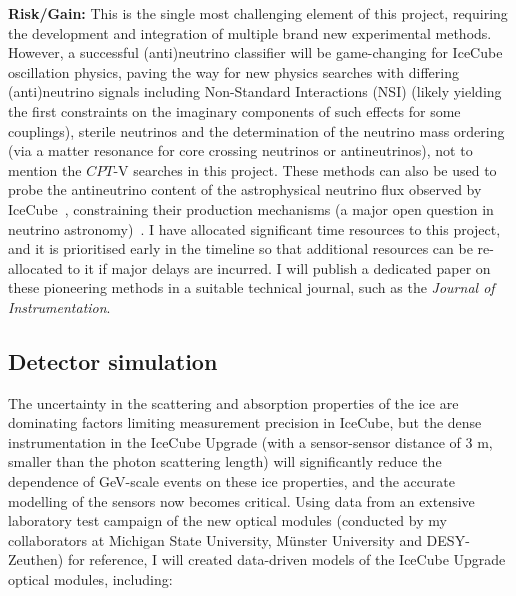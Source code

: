 \documentclass[a4paper,11pt]{article}
\begin{document}
\textbf{Risk/Gain:} This is the single most challenging element of this project, requiring the development and integration of multiple brand new experimental methods. However, a successful (anti)neutrino classifier will be game-changing for IceCube oscillation physics, paving the way for new physics searches with differing (anti)neutrino signals including Non-Standard Interactions (NSI) (likely yielding the first constraints on the imaginary components of such effects for some couplings), sterile neutrinos and the determination of the neutrino mass ordering (via a matter resonance for core crossing neutrinos or antineutrinos), not to mention the $CPT$-V searches in this project. These methods can also be used to probe the antineutrino content of the astrophysical neutrino flux observed by IceCube~\cite{Aartsen:2013jdh}, constraining their production mechanisms (a major open question in neutrino astronomy)~\cite{glashow_icecube}. I have allocated significant time resources to this project, and it is prioritised early in the timeline so that additional resources can be re-allocated to it if major delays are incurred. I will publish a dedicated paper on these pioneering methods in a suitable technical journal, such as the \textit{Journal of Instrumentation}. \\



\subsection{Detector simulation}

The uncertainty in the scattering and absorption properties of the ice are dominating factors limiting measurement precision in IceCube, but the dense instrumentation in the IceCube Upgrade (with a sensor-sensor distance of 3 m, smaller than the photon scattering length) will significantly reduce the dependence of GeV-scale events on these ice properties, and the accurate modelling of the sensors now becomes critical. Using data from an extensive laboratory test campaign of the new optical modules (conducted by my collaborators at Michigan State University, M{\"u}nster University and DESY-Zeuthen) for reference, I will created data-driven models of the IceCube Upgrade optical modules, including:
\end{document}
